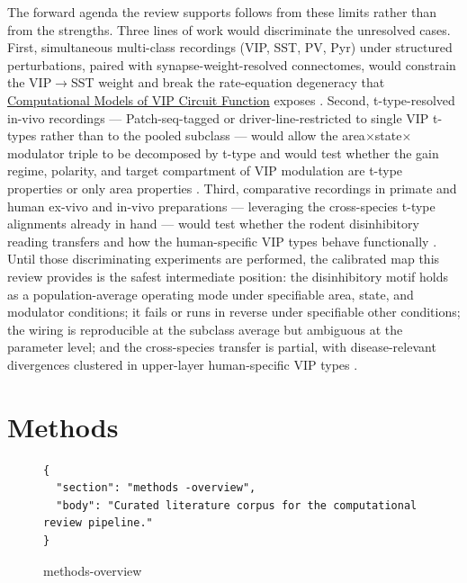 \documentclass[11pt]{article}
\let\origrightarrow\rightarrow
\def\rightarrow{\ensuremath{\origrightarrow}}
\begin{document}
The forward agenda the review supports follows from these limits rather than from the strengths. Three lines of work would discriminate the unresolved cases. First, simultaneous multi-class recordings (VIP, SST, PV, Pyr) under structured perturbations, paired with synapse-weight-resolved connectomes, would constrain the VIP\rightarrow SST weight and break the rate-equation degeneracy that \href{/computational-models}{Computational Models of VIP Circuit Function} exposes \citep{Schneidermizell2025, Reimann2026, Hertag2019, Bos2025, Sabri2024}. Second, t-type-resolved in-vivo recordings --- Patch-seq-tagged or driver-line-restricted to single VIP t-types rather than to the pooled subclass --- would allow the area$\times$state$\times$modulator triple to be decomposed by t-type and would test whether the gain regime, polarity, and target compartment of VIP modulation are t-type properties or only area properties \citep{Gouwens2020a, Pronneke2015, Apicella2022, Schneidermizell2025, Tasic2018}. Third, comparative recordings in primate and human ex-vivo and in-vivo preparations --- leveraging the cross-species t-type alignments already in hand --- would test whether the rodent disinhibitory reading transfers and how the human-specific VIP types behave functionally \citep{Hodge2019, Boldog2018, Chartrand2023, Bakken2021a, Krienen2020, Lee2023a}. Until those discriminating experiments are performed, the calibrated map this review provides is the safest intermediate position: the disinhibitory motif holds as a population-average operating mode under specifiable area, state, and modulator conditions; it fails or runs in reverse under specifiable other conditions; the wiring is reproducible at the subclass average but ambiguous at the parameter level; and the cross-species transfer is partial, with disease-relevant divergences clustered in upper-layer human-specific VIP types \citep{Pi2013, Pakan2016, Dipoppa2018, Garciadelmolino2017, Reimann2026, Hodge2019, Chartrand2023, Mcfarlan2024a}.


\section{Methods}
\label{sec:Methods}

\begin{figure}[h]
\centering
\begin{verbatim}
{
  "section": "methods -overview",
  "body": "Curated literature corpus for the computational review pipeline."
}
\end{verbatim}
\caption*{methods-overview}
\end{figure}
\end{document}
